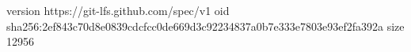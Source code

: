 version https://git-lfs.github.com/spec/v1
oid sha256:2ef843c70d8e0839cdcfcc0de669d3c92234837a0b7e333e7803e93ef2fa392a
size 12956
